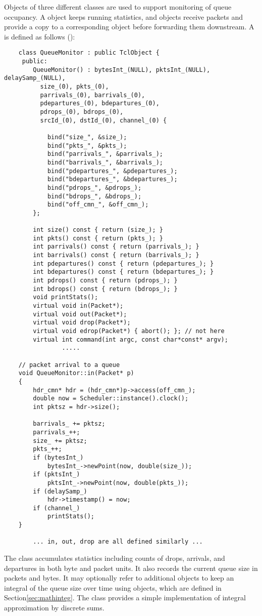 Objects of three different classes are used to support monitoring
of queue occupancy.
A  object keeps running statistics, and
 objects receive packets and provide
a copy to a corresponding  object before forwarding
them downstream.
A  is defined as follows ():
\begin{small}
\begin{verbatim}
	class QueueMonitor : public TclObject {
	 public: 
		QueueMonitor() : bytesInt_(NULL), pktsInt_(NULL), delaySamp_(NULL),
		  size_(0), pkts_(0),
		  parrivals_(0), barrivals_(0),
		  pdepartures_(0), bdepartures_(0),
		  pdrops_(0), bdrops_(0),
		  srcId_(0), dstId_(0), channel_(0) {

			bind("size_", &size_);
			bind("pkts_", &pkts_);
			bind("parrivals_", &parrivals_);
			bind("barrivals_", &barrivals_);
			bind("pdepartures_", &pdepartures_);
			bind("bdepartures_", &bdepartures_);
			bind("pdrops_", &pdrops_);
			bind("bdrops_", &bdrops_);
			bind("off_cmn_", &off_cmn_);
		};

		int size() const { return (size_); }
		int pkts() const { return (pkts_); }
		int parrivals() const { return (parrivals_); }
		int barrivals() const { return (barrivals_); }
		int pdepartures() const { return (pdepartures_); }
		int bdepartures() const { return (bdepartures_); }
		int pdrops() const { return (pdrops_); }
		int bdrops() const { return (bdrops_); }
		void printStats();
		virtual void in(Packet*);
		virtual void out(Packet*);
		virtual void drop(Packet*);
		virtual void edrop(Packet*) { abort(); }; // not here
		virtual int command(int argc, const char*const* argv);
                .....

	// packet arrival to a queue
	void QueueMonitor::in(Packet* p)
	{
		hdr_cmn* hdr = (hdr_cmn*)p->access(off_cmn_);
		double now = Scheduler::instance().clock();
		int pktsz = hdr->size();

		barrivals_ += pktsz;
		parrivals_++;
		size_ += pktsz;
		pkts_++;
		if (bytesInt_)
			bytesInt_->newPoint(now, double(size_));
		if (pktsInt_)
			pktsInt_->newPoint(now, double(pkts_));
		if (delaySamp_)
			hdr->timestamp() = now;
		if (channel_)
			printStats();
	}

        ... in, out, drop are all defined similarly ...
\end{verbatim}
\end{small}
The  class accumulates statistics including
counts of drops, arrivals, and departures in both byte and packet
units.
It also records the current queue size in packets and bytes.
It may optionally refer to additional objects to keep an integral
of the queue size over time using
 objects, which are defined in Section\ref{sec:mathinteg}.
The  class provides a simple implementation of
integral approximation by discrete sums.

